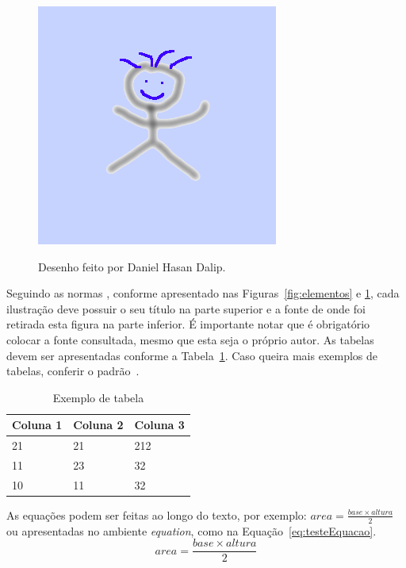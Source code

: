 \begin{figure}[htb!]
    \centering
    \caption{Desenho feito por Daniel Hasan Dalip.}
    \includegraphics[keepaspectratio=true,scale=0.62]
    	{img/desenho.png}
    \label{fig:desenhoAutor}
\end{figure}

Seguindo as normas  \cite{ibge1993,abntTxtAcad2011}, conforme apresentado nas Figuras~\ref{fig:elementos} e \ref{fig:desenhoAutor}, cada ilustração deve possuir o seu título na parte superior e a fonte de onde foi retirada esta figura na parte inferior. É importante notar que é obrigatório colocar a fonte consultada, mesmo que esta seja o próprio autor. As tabelas devem ser apresentadas conforme a Tabela~\ref{tab:exemploTabela}. Caso queira mais exemplos de tabelas, 
conferir o padrão~. 

\begin{table}[]
\centering
\caption{Exemplo de tabela}
\label{tab:exemploTabela}
\begin{tabular}{lll}
\toprule
Coluna 1                                              & Coluna 2            & Coluna 3 \\ \midrule
21		                                              & 21            		& 212 \\ 
11		                                              & 23            		& 32 \\ 
10		                                              & 11		            & 32 \\ \bottomrule
\end{tabular}
\end{table}

As equações podem ser feitas ao longo do texto, por exemplo: $area = \frac{base \times altura}{2}$ ou apresentadas no ambiente \textit{equation}, como na Equação~\ref{eq:testeEquacao}.
\begin{equation}
	area = \frac{base \times altura}{2}
    \label{eq:testeEquacao}
\end{equation}

